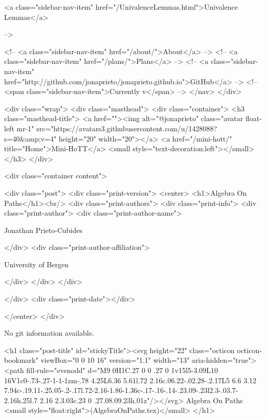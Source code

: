       
    
      
        
          <a class="sidebar-nav-item" href="/UnivalenceLemmas.html">Univalence Lemmas</a>
        
      
     -->

    <!-- <a class="sidebar-nav-item" href="/about/">About</a> -->
    <!-- <a class="sidebar-nav-item" href="/plans/">Plans</a> -->
    <!-- <a class="sidebar-nav-item" href="http://github.com/jonaprieto/jonaprieto.github.io">GitHub</a> -->
    <!-- <span class="sidebar-nav-item">Currently v</span> -->
  </nav>
</div>

    <div class="wrap">
      <div class="masthead">
        <div class="container">
          <h3 class="masthead-title">
            <a href=""><img alt="@jonaprieto" class="avatar float-left mr-1" src="https://avatars3.githubusercontent.com/u/1428088?s=40&amp;v=4" height="20" width="20"></a>
            <a href="/mini-hott/" title="Home">Mini-HoTT</a>
            <small style="text-decoration:left"></small>
          </h3>
        </div>
      
      <div class="container content">
        







<div class="post">
  <div class="print-version">
    <center>
      <h1>Algebra On Paths</h1><br/>
        <div class="print-authors">
          <div class="print-info">
            <div class="print-author">
              <div class="print-author-name">
                
                  Jonathan Prieto-Cubides
                
              </div>
              <div class="print-author-affiliation">
                
                  University of Bergen
                
                </div>
            </div>
          </div>
          
          
        </div>
        <div class="print-date"></div>
        
        
    </center>
  </div>

  
  No git information available.
  

  <h1 class="post-title" id="stickyTitle"><svg height="22" class="octicon octicon-bookmark" viewBox="0 0 10 16" version="1.1" width="13" aria-hidden="true"><path fill-rule="evenodd" d="M9 0H1C.27 0 0 .27 0 1v15l5-3.09L10 16V1c0-.73-.27-1-1-1zm-.78 4.25L6.36 5.61l.72 2.16c.06.22-.02.28-.2.17L5 6.6 3.12 7.94c-.19.11-.25.05-.2-.17l.72-2.16-1.86-1.36c-.17-.16-.14-.23.09-.23l2.3-.03.7-2.16h.25l.7 2.16 2.3.03c.23 0 .27.08.09.23h.01z"/></svg> Algebra On Paths <small style="float:right">(AlgebraOnPaths.tex)</small>
  </h1>

